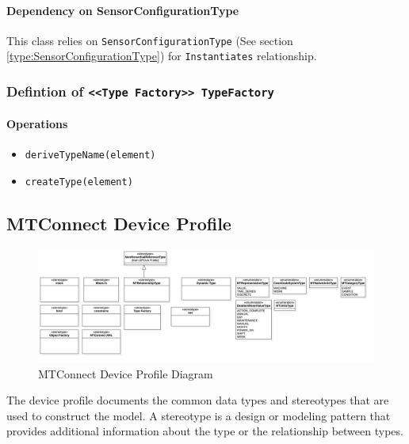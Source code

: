 \paragraph{Dependency on SensorConfigurationType}

This class relies on \texttt{SensorConfigurationType} (See section \ref{type:SensorConfigurationType}) for \texttt{Instantiates} relationship.

\FloatBarrier
\subsubsection{Defintion of \texttt{<<Type Factory>> TypeFactory}} \label{type:TypeFactory}

\FloatBarrier



\paragraph{Operations}
\begin{itemize}
  \item \texttt{deriveTypeName(element)}
  \item \texttt{createType(element)}
\end{itemize}
\FloatBarrier
\subsection{MTConnect Device Profile}

\begin{figure}
  \centering
    \includegraphics[width=1.0\textwidth]{diagrams/MTConnect Device Profile.png}
  \caption{MTConnect Device Profile Diagram}
  \label{fig:MTConnect Device Profile}
\end{figure}

\FloatBarrier


The device profile documents the common data types and stereotypes that are 
used to construct the model. A stereotype is a design or modeling pattern that 
provides additional information about the type or the relationship between types. 

